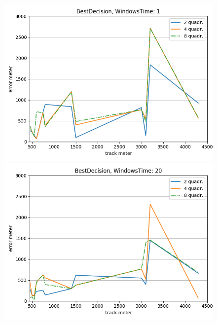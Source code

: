 \documentclass[12pt,a4paper,openright,twoside]{report}
\begin{document}
\begin{figure}[H]
\centering 
\includegraphics[scale=0.4]{thirdChartBestDecision-1} 
\includegraphics[scale=0.4]{thirdChartBestDecision-20} 
\end{figure}
\end{document}
